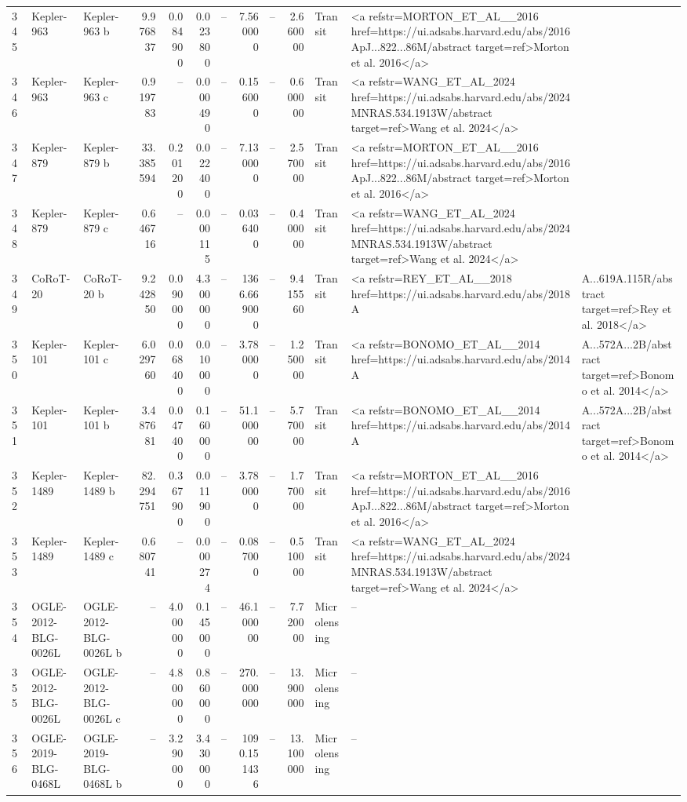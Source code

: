\begin{tabular}{lllrrrrrrrll}
345 & Kepler-963 & Kepler-963 b & 9.976837 & 0.084900 & 0.023800 & -- & 7.560000 & -- & 2.660000 & Transit & <a refstr=MORTON_ET_AL__2016 href=https://ui.adsabs.harvard.edu/abs/2016ApJ...822...86M/abstract target=ref>Morton et al. 2016</a> \\
346 & Kepler-963 & Kepler-963 c & 0.919783 & -- & 0.000490 & -- & 0.156000 & -- & 0.600000 & Transit & <a refstr=WANG_ET_AL_2024 href=https://ui.adsabs.harvard.edu/abs/2024MNRAS.534.1913W/abstract target=ref>Wang et al. 2024</a> \\
347 & Kepler-879 & Kepler-879 b & 33.385594 & 0.201200 & 0.022400 & -- & 7.130000 & -- & 2.570000 & Transit & <a refstr=MORTON_ET_AL__2016 href=https://ui.adsabs.harvard.edu/abs/2016ApJ...822...86M/abstract target=ref>Morton et al. 2016</a> \\
348 & Kepler-879 & Kepler-879 c & 0.646716 & -- & 0.000115 & -- & 0.036400 & -- & 0.400000 & Transit & <a refstr=WANG_ET_AL_2024 href=https://ui.adsabs.harvard.edu/abs/2024MNRAS.534.1913W/abstract target=ref>Wang et al. 2024</a> \\
349 & CoRoT-20 & CoRoT-20 b & 9.242850 & 0.090000 & 4.300000 & -- & 1366.669000 & -- & 9.415560 & Transit & <a refstr=REY_ET_AL__2018 href=https://ui.adsabs.harvard.edu/abs/2018A&A...619A.115R/abstract target=ref>Rey et al. 2018</a> \\
350 & Kepler-101 & Kepler-101 c & 6.029760 & 0.068400 & 0.010000 & -- & 3.780000 & -- & 1.250000 & Transit & <a refstr=BONOMO_ET_AL__2014 href=https://ui.adsabs.harvard.edu/abs/2014A&A...572A...2B/abstract target=ref>Bonomo et al. 2014</a> \\
351 & Kepler-101 & Kepler-101 b & 3.487681 & 0.047400 & 0.160000 & -- & 51.100000 & -- & 5.770000 & Transit & <a refstr=BONOMO_ET_AL__2014 href=https://ui.adsabs.harvard.edu/abs/2014A&A...572A...2B/abstract target=ref>Bonomo et al. 2014</a> \\
352 & Kepler-1489 & Kepler-1489 b & 82.294751 & 0.367900 & 0.011900 & -- & 3.780000 & -- & 1.770000 & Transit & <a refstr=MORTON_ET_AL__2016 href=https://ui.adsabs.harvard.edu/abs/2016ApJ...822...86M/abstract target=ref>Morton et al. 2016</a> \\
353 & Kepler-1489 & Kepler-1489 c & 0.680741 & -- & 0.000274 & -- & 0.087000 & -- & 0.510000 & Transit & <a refstr=WANG_ET_AL_2024 href=https://ui.adsabs.harvard.edu/abs/2024MNRAS.534.1913W/abstract target=ref>Wang et al. 2024</a> \\
354 & OGLE-2012-BLG-0026L & OGLE-2012-BLG-0026L b & -- & 4.000000 & 0.145000 & -- & 46.100000 & -- & 7.720000 & Microlensing & -- \\
355 & OGLE-2012-BLG-0026L & OGLE-2012-BLG-0026L c & -- & 4.800000 & 0.860000 & -- & 270.000000 & -- & 13.900000 & Microlensing & -- \\
356 & OGLE-2019-BLG-0468L & OGLE-2019-BLG-0468L b & -- & 3.290000 & 3.430000 & -- & 1090.151436 & -- & 13.100000 & Microlensing & -- \\
\bottomrule
\end{tabular}

